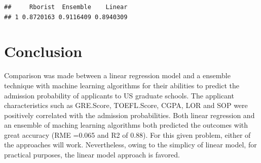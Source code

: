 \documentclass[11pt,]{article}
\begin{document}
\begin{verbatim}
##     Rborist  Ensemble    Linear
## 1 0.8720163 0.9116409 0.8940309
\end{verbatim}

\hypertarget{conclusion}{%
\section{Conclusion}\label{conclusion}}

Comparison was made between a linear regression model and a ensemble
technique with machine learning algorithms for their abilities to
predict the admission probability of applicants to US graduate schools.
The applicant characteristics such as GRE.Score, TOEFL.Score, CGPA, LOR
and SOP were positively correlated with the admission probabilities.
Both linear regression and an ensemble of maching learning algorithms
both predicted the outcomes with great accuracy (RME =0.065 and R2 of
0.88). For this given problem, either of the approaches will work.
Nevertheless, owing to the simplicy of linear model, for practical
purposes, the linear model approach is favored.





\newpage
\singlespacing 
\end{document}
